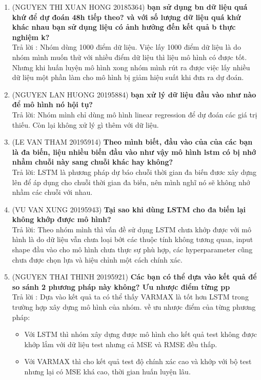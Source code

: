 \documentclass[13pt]{report}
\numberwithin{equation}{section}
\begin{document}
\begin{enumerate}
    \item (NGUYEN THI XUAN HONG 20185364)\textbf{ bạn sử dụng bn dữ liệu quá khứ để dự đoán 48h tiếp theo? và với số lượng dữ liệu quá khứ khác nhau bạn sử dụng liệu có ảnh hưởng đến kết quả b thực nghiệm k?}\\
    Trả lời : Nhóm dùng 1000 điểm dữ liệu. Việc lấy 1000 điểm dữ liệu là do nhóm mình muốn thử với nhiều điểm dữ liệu thì liệu mô hình có được tốt. Nhưng khi huấn luyện mô hình xong nhóm mình rút ra được việc lấy nhiều dữ liệu một phần làm cho mô hình bị giảm hiệu suất khi đưa ra dự đoán.
    
    \item (NGUYEN LAN HUONG 20195884)\textbf{ bạn xử lý dữ liệu đầu vào như nào để mô hình nó hội tụ?}\\
    Trả lời: Nhóm mình chỉ dùng mô hình linear regression để dự đoán các giá trị thiếu. Còn lại không xử lý gì thêm với dữ liệu.
    
    \item (LE VAN THAM 20195914)\textbf{
    Theo mình biết, đầu vào của của các bạn là đa biến, liệu nhiều biến đầu vào như vậy mô hình lstm có bị nhớ nhầm chuỗi này sang chuỗi khác hay không?}\\
    Trả lời: LSTM là phương pháp dự báo chuỗi thời gian đa biến đươc xây dựng lên để áp dụng cho chuỗi thời gian đa biến, nên mình nghĩ nó sẽ không nhớ nhầm các chuỗi với nhau.
    \item (VU VAN XUNG 20195943)\textbf{
    Tại sao khi dùng LSTM cho đa biến lại không khớp được mô hình?}\\
    Trả lời:
Theo nhóm mình thì vấn đề sử dụng LSTM chưa khớp được với mô hình là do dữ liệu vẫn chưa loại bớt các thuộc tính không tương quan, input shape đầu vào cho mô hình chưa thực sự phù hợp, các hyperparameter cũng chưa được chọn lựa và hiệu chỉnh một cách chính xác.

    \item (NGUYEN THAI THINH 20195921)\textbf{
    Các bạn có thể dựa vào kết quả để so sánh 2 phương pháp này không? Ưu nhược điểm từng pp}\\
    Trả lời : Dựa vào kết quả ta có thể thấy VARMAX là tốt hơn LSTM trong trường hợp xây dựng mô hình của nhóm. 
    về ưu nhược điểm của từng phương pháp:
    \begin{itemize}
        \item Với LSTM thì nhóm xây dựng được mô hình cho kết quả test không được khớp lắm với dữ liệu test nhưng cả MSE và RMSE đều thấp.
        \item Với VARMAX thì cho kết quả test độ chính xác cao và khớp với bộ test nhưng lại có MSE khá cao, thời gian huấn luyện lâu.
    \end{itemize}
    

\end{enumerate}
\end{document}
